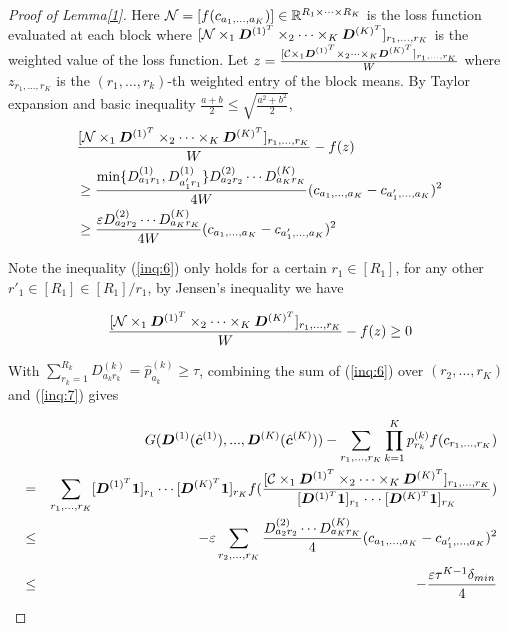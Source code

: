 \documentclass{article}
\begin{document}
\begin{appendices}
\begin{proof}[Proof of Lemma\ref{1}]
Here $\mathcal{N}=[f(c_{a_1,...,a_K})]\in \mathbb{R}^{R_1\times\cdots\times R_K}$ is the loss function evaluated at each block where $[\mathcal{N}\times_1\boldsymbol{D}^{(1)^T}\times_2\cdots \times_K\boldsymbol{D}^{(K)^T}]_{r_1,...,r_K}$ is the weighted value of the loss function.
Let $z = \frac{[\mathcal{C}\times_1\boldsymbol{D}^{(1)^T}\times_2\cdots\times_K \boldsymbol{D}^{(K)^T}]_{r_1,...,r_K}}{W}$ where $z_{r_1,...,r_K}$ is the $(r_1,...,r_k)$-th weighted entry of the block means. By Taylor expansion and basic inequality $\frac{a+b}{2}\leq \sqrt{\frac{a^2+b^2}{2}}$,
\begin{equation}
\begin{split}
   &\frac{[\mathcal{N}\times_1\boldsymbol{D}^{(1)^T}\times_2\cdots \times_K\boldsymbol{D}^{(K)^T}]_{r_1,...,r_K}}{W}-f(z)\\
   &\geq \frac{\min\{D_{a_1r_1}^{(1)},D_{a_1'r_1}^{(1)}\}D_{a_2r_2}^{(2)}\cdots D_{a_Kr_K}^{(K)}}{4W}(c_{a_1,...,a_K}-c_{a_1',...,a_K})^2\\
   &\geq  \frac{\varepsilon D_{a_2r_2}^{(2)}\cdots D_{a_Kr_K}^{(K)}}{4W}(c_{a_1,...,a_K}-c_{a_1',...,a_K})^2\\
\end{split}\label{inq:6}
\end{equation}

Note the inequality (\eqref{inq:6}) only holds for a certain $r_1\in[R_1]$, for any other $r'_1\in[R_1]\in [R_1]/{r_1}$, by Jensen's inequality we have

\begin{equation} 
    \frac{[\mathcal{N}\times_1\boldsymbol{D}^{(1)^T}\times_2\cdots \times_K\boldsymbol{D}^{(K)^T}]_{r_1,...,r_K}}{W}-f(z) \geq 0
    \label{inq:7}
\end{equation}


With $\displaystyle\sum_{r_k=1}^{R_k}D_{a_kr_k}^{(k)}=\hat{p}_{a_k}^{(k)}\geq \tau$, combining the sum of (\eqref{inq:6}) over $(r_2,...,r_K)$ and (\eqref{inq:7}) gives

\begin{eqnarray*}
&&G(\boldsymbol{D}^{(1)}(\hat{\boldsymbol{c}}^{(1)}),...,\boldsymbol{D}^{(K)}(\hat{\boldsymbol{c}}^{(K)}))-\displaystyle\sum_{r_1,...,r_K}\prod_{k=1}^Kp_{r_k}^{(k)}f(c_{r_1,...,r_K})\\
&=&\displaystyle\sum_{r_1,...,r_K}[\boldsymbol{D}^{(1)^T}\boldsymbol{1}]_{r_1}\cdots [\boldsymbol{D}^{(K)^T}\boldsymbol{1}]_{r_K}f(\frac{[\mathcal{C}\times_1 \boldsymbol{D}^{(1)^T}\times_2\cdots \times_K \boldsymbol{D}^{(K)^T}]_{r_1,...,r_K}}{[\boldsymbol{D}^{(1)^T}\boldsymbol{1}]_{r_1}\cdot\cdot\cdot [\boldsymbol{D}^{(K)^T}\boldsymbol{1}]_{r_K}})\\
&\leq& -\varepsilon\displaystyle\sum_{r_2,...,r_K}\frac{D_{a_2r_2}^{(2)}\cdots D_{a_Kr_K}^{(K)}}{4}(c_{a_1,...,a_K}-c_{a_1',...,a_K})^2\\
&\leq& -\frac{\varepsilon\tau^{K-1}\delta_{min}}{4}
\end{eqnarray*}


\end{proof}
\end{appendices}
\end{document}

